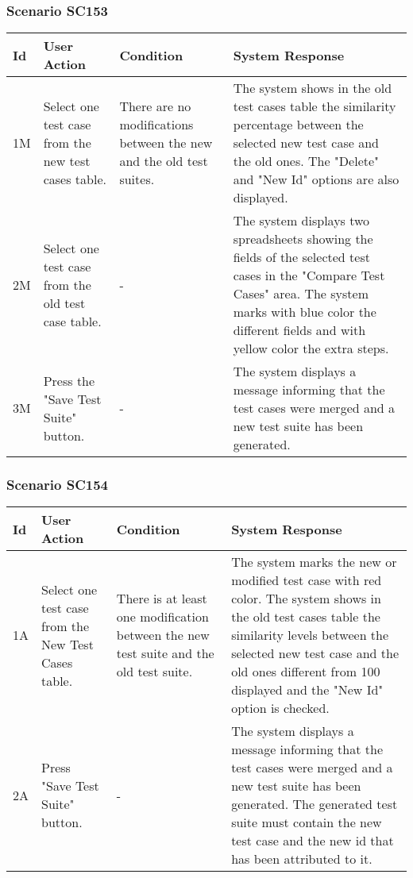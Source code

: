 \documentclass[a4paper,11pt]{article}
\newcommand{\bl}{\\ \hline}
\begin{document}
\subsubsection*{Scenario SC153}
\begin{tabular}{|p{0.4in}|p{1.5in}|p{1.5in}|p{1.5in}|}
\hline
Id & User Action & Condition & System Response \bl 
1M & Select one test case from the new test cases table.
					 & There are no modifications between the new and the old
						test suites. & The system shows in the old test cases table the
						similarity percentage between the selected new test case and the
						old ones. The "Delete" and "New Id" options are also displayed.
					\bl
2M & Select one test case from the old test case table. & - & The system displays two spreadsheets showing the fields
						of the selected test cases in the "Compare Test Cases" area. The
						system marks with blue color the different fields and with yellow
						color the extra steps.\bl
3M & Press the "Save Test Suite" button. & - & The system displays a message informing that the test
						cases were merged and a new test suite has been generated.
					\bl
\end{tabular}
\subsubsection*{Scenario SC154}
\begin{tabular}{|p{0.4in}|p{1.5in}|p{1.5in}|p{1.5in}|}
\hline
Id & User Action & Condition & System Response \bl 
1A & Select one test case from the New Test Cases table.
					 & There is at least one modification between the new test
						suite and the old test suite.  & The system marks the new or modified test case with red
						color. The system shows in the old test cases table the similarity
						levels between the selected new test case and the old ones
						different from 100%
						displayed and the "New Id" option is checked.\bl
2A & Press "Save Test Suite" button. & - & The system displays a message informing that the test
						cases were merged and a new test suite has been generated. The
						generated test suite must contain the new test case and the new id
						that has been attributed to it.\bl
\end{tabular}
\end{document}

